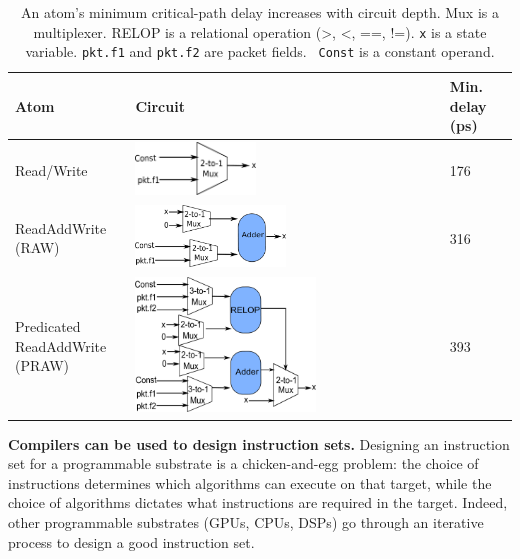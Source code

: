 \begin{table}[!t]
  \centering
  \begin{small}
    \begin{tabular}{|p{}|p{}|p{}|}
  \hline
  Atom & Circuit & Min. delay (ps) \\
  \hline
  Read/Write & \centering\includegraphics[width=0.4\textwidth]{domino_rw.pdf} & 176 \\
  \hline
  ReadAddWrite (RAW) & \centering\includegraphics[width=0.5\textwidth]{domino_raw.pdf} & 316\\
  \hline
  \pbox{0.1\textwidth}
  {Predicated\\
  ReadAddWrite (PRAW)} & \centering\includegraphics[width=0.6\textwidth]{domino_pred_raw.pdf}  & 393 \\
  \hline
  \end{tabular}
\end{small}
\caption{An atom's minimum critical-path delay increases with circuit depth.
Mux is a multiplexer. RELOP is a relational operation (>, <, ==, !=). {\tt x}
is a state variable. {\tt pkt.f1} and {\tt pkt.f2} are packet fields. {\tt
Const} is a constant operand.}
\label{tab:circuits}
\end{table}

\medskip
\noindent
\textbf{Compilers can be used to design instruction sets.}
Designing an instruction set for a programmable substrate is a chicken-and-egg
problem: the choice of instructions determines which algorithms can execute on
that target, while the choice of algorithms dictates what instructions are
required in the target. Indeed, other programmable substrates (GPUs, CPUs,
DSPs) go through an iterative process to design a good instruction set.

